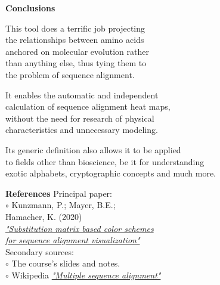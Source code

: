 \documentclass[bigger]{beamer}
\newcommand{\blank}[1]{\hspace*{#1}}
\newcommand{\mysp}{\blank{0.3cm}}
\newcommand{\tb}[1]{\textbf{#1}}
\newcommand{\ti}[1]{\textit{#1}}
\begin{document}
\begin{frame}{\tb{Conclusions}}
    \footnotesize

    This tool does a terrific job projecting\\
    the relationships between amino acids\\
    anchored on molecular evolution rather\\
    than anything else, thus tying them to\\
    the problem of sequence alignment.

    \hfill
    
    It enables the automatic and independent\\
    calculation of sequence alignment heat maps,\\
    without the need for research of physical\\
    characteristics and unnecessary modeling.

    \hfill

    Its generic definition also allows it to be applied\\
    to fields other than bioscience, be it for understanding\\
    exotic alphabets, cryptographic concepts and much more.
    
\end{frame}

\begin{frame}{\tb{References}}
    \footnotesize
    Principal paper:
    \newline\\
    $\circ$ Kunzmann, P.; Mayer, B.E.;\\ \mysp Hamacher, K. (2020)\\
    \href{https://bmcbioinformatics.biomedcentral.com/articles/10.1186/s12859-020-3526-6}
    {\mysp \ti{"Substitution matrix based color schemes\\ \mysp for sequence alignment visualization"}}
    \newline\\

    Secondary sources:
    \newline\\
    $\circ$ The course's slides and notes.\\
    $\circ$ Wikipedia
    \href{https://en.wikipedia.org/wiki/Multiple_sequence_alignment}
    {\mysp \ti{"Multiple sequence alignment"}}
    
\end{frame}
\end{document}
